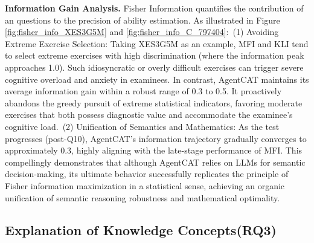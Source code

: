 

\textbf{Information Gain Analysis.} Fisher Information quantifies the contribution of an questions to the precision of ability estimation. As illustrated in Figure \ref{fig:fisher_info_XES3G5M} and \ref{fig:fisher_info_C_797404}:~(1) Avoiding Extreme Exercise Selection: Taking XES3G5M as an example, MFI and KLI tend to select extreme exercises with high discrimination (where the information peak approaches 1.0). Such idiosyncratic or overly difficult exercises can trigger severe cognitive overload and anxiety in examinees. In contrast, AgentCAT maintains its average information gain within a robust range of 0.3 to 0.5. It proactively abandons the greedy pursuit of extreme statistical indicators, favoring moderate exercises that both possess diagnostic value and accommodate the examinee's cognitive load.~(2) Unification of Semantics and Mathematics: As the test progresses (post-Q10), AgentCAT's information trajectory gradually converges to approximately 0.3, highly aligning with the late-stage performance of MFI. This compellingly demonstrates that although AgentCAT relies on LLMs for semantic decision-making, its ultimate behavior successfully replicates the principle of Fisher information maximization in a statistical sense, achieving an organic unification of semantic reasoning robustness and mathematical optimality.




\subsection{Explanation of Knowledge Concepts(RQ3)}



